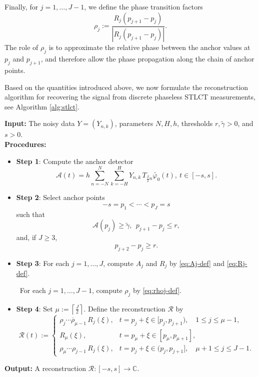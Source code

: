 \documentclass[11pt, reqno]{amsart}
\newcommand{\C}{\mathbb{C}}
\numberwithin{equation}{section}
\begin{document}
Finally, for $j=1,\dots,J-1$, we define the phase transition factors
\begin{equation}\label{eq:rhoj-def}
\rho_j := \frac{R_j(p_{j+1}-p_j)}{|R_j(p_{j+1}-p_j)|}.
\end{equation}
The role of $\rho_j$ is to approximate the relative phase between the anchor values at $p_j$ and $p_{j+1}$, and therefore allow the phase propagation along the chain of anchor points. 

Based on the quantities introduced above, we now formulate the reconstruction algorithm for recovering the signal from discrete phaseless STLCT measurements, see Algorithm \ref{alg:stlct}. 



\begin{algorithm}[h!]
\SetAlgoLined
\caption{Reconstruction from noisy phaseless STLCT samples}
\label{alg:stlct}
\textbf{Input:} The noisy data $Y=(Y_{n,k})$, parameters $N,H,h$, thresholds $r,\widetilde\gamma>0$, and $s>0$.   \\ 



\textbf{\bf Procedures:}
\begin{itemize}
\item[] {\bf Step 1}: Compute the anchor detector
\begin{equation}\label{mathcalA.alg.eq1} 
\mathcal A(t) = h\sum_{n=-N}^{N}\sum_{k=-H}^{H} Y_{n,k}\,T_{\frac{\beta}{2}n}\widetilde{\varphi_0}(t), \ t\in[-s,s].
\end{equation}

\item[] {\bf Step 2}: Select anchor points 
$$ -s=p_1<\cdots<p_J=s $$ 
such that
$$\mathcal A(p_j)\ge \widetilde\gamma, \  \ 
p_{j+1}-p_j\le  r,$$
and, if $J\ge 3$,
$$p_{j+2}-p_j\ge  r. $$


\item[] {\bf Step 3}: For each $j=1,\dots,J$, compute $A_j$ and $R_j$ by \eqref{eq:Aj-def} and \eqref{eq:Rj-def}.

 \qquad   \    For each $j=1,\dots,J-1$, compute $\rho_j$ by \eqref{eq:rhoj-def}.

\item[] {\bf Step 4}: Set $
\mu:=\left\lceil \frac{J}{2}\right\rceil$. Define the reconstruction $\mathcal R$ by
\begin{equation}\label{rec.alg.eq}
 \mathcal R(t):=
\begin{cases}
\overline{\rho_j\cdots\rho_{\mu-1}}\,R_j(\xi),
& t=p_j+\xi\in[p_j,p_{j+1}),\quad 1\le j\le \mu-1,\\[0.4em]
R_\mu(\xi),
& t=p_\mu+\xi\in[p_\mu,p_{\mu+1}],\\[0.4em]
\rho_\mu\cdots\rho_{j-1}\,R_j(\xi),
& t=p_j+\xi\in(p_j,p_{j+1}],\quad \mu+1\le j\le J-1.
\end{cases}   
\end{equation}

\end{itemize}

\textbf{Output:} A reconstruction $\mathcal R:[-s,s]\to \C$.
\end{algorithm}
\end{document}
